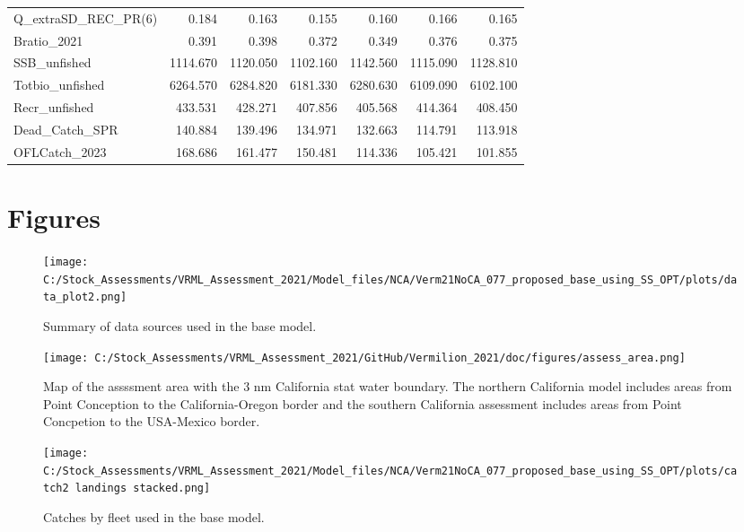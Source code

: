 \documentclass[
  english,
  a4paper,
]{article}
\begin{document}
\begin{table}
{\begin{tabular}[t]{lrrrrrr}
Q\_extraSD\_REC\_PR(6) & 0.184 & 0.163 & 0.155 & 0.160 & 0.166 & 0.165\\
Bratio\_2021 & 0.391 & 0.398 & 0.372 & 0.349 & 0.376 & 0.375\\
SSB\_unfished & 1114.670 & 1120.050 & 1102.160 & 1142.560 & 1115.090 & 1128.810\\
Totbio\_unfished & 6264.570 & 6284.820 & 6181.330 & 6280.630 & 6109.090 & 6102.100\\
Recr\_unfished & 433.531 & 428.271 & 407.856 & 405.568 & 414.364 & 408.450\\
Dead\_Catch\_SPR & 140.884 & 139.496 & 134.971 & 132.663 & 114.791 & 113.918\\
OFLCatch\_2023 & 168.686 & 161.477 & 150.481 & 114.336 & 105.421 & 101.855\\
\bottomrule
\end{tabular}}
\end{table}

\clearpage

\hypertarget{figures}{%
\section{Figures}\label{figures}}

\begin{figure}
\centering
\texttt{[image: C:/Stock\_Assessments/VRML\_Assessment\_2021/Model\_files/NCA/Verm21NoCA\_077\_proposed\_base\_using\_SS\_OPT/plots/data\_plot2.png]}
\caption{Summary of data sources used in the base model.\label{fig:data-plot}}
\end{figure}

\begin{figure}
\centering
\texttt{[image: C:/Stock\_Assessments/VRML\_Assessment\_2021/GitHub/Vermilion\_2021/doc/figures/assess\_area.png]}
\caption{Map of the assssment area with the 3 nm California stat water boundary. The northern California model includes areas from Point Conception to the California-Oregon border and the southern California assessment includes areas from Point Concpetion to the USA-Mexico border.\label{fig:assess-area}}
\end{figure}

\begin{figure}
\centering
\texttt{[image: C:/Stock\_Assessments/VRML\_Assessment\_2021/Model\_files/NCA/Verm21NoCA\_077\_proposed\_base\_using\_SS\_OPT/plots/catch2 landings stacked.png]}
\caption{Catches by fleet used in the base model.\label{fig:catch}}
\end{figure}
\end{document}
